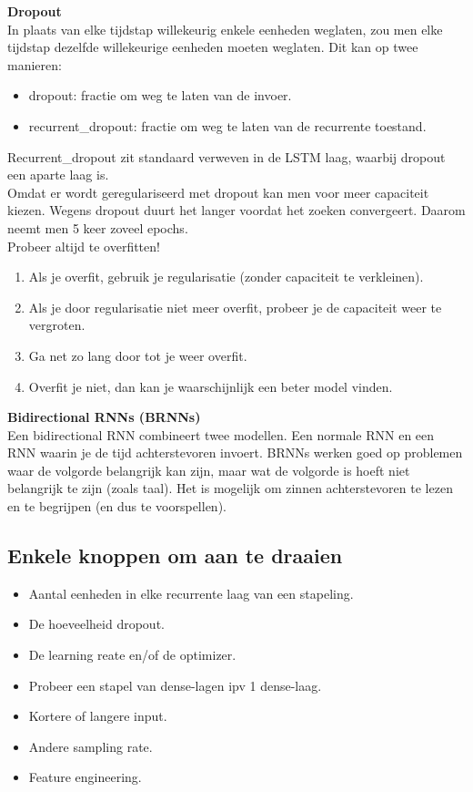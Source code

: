 {\textbf{Dropout}\\
In plaats van elke tijdstap willekeurig enkele eenheden weglaten, zou men elke tijdstap dezelfde willekeurige eenheden moeten weglaten. Dit kan op twee manieren:
\begin{itemize}
    \item {\selectfont dropout}: fractie om weg te laten van de invoer.
    \item {\selectfont recurrent\_dropout}: fractie om weg te laten van de recurrente toestand.
\end{itemize}
{\selectfont Recurrent\_dropout} zit standaard verweven in de LSTM laag, waarbij {\selectfont dropout} een aparte laag is.\\

\noindent Omdat er wordt geregulariseerd met dropout kan men voor meer capaciteit kiezen. Wegens dropout duurt het langer voordat het zoeken convergeert. Daarom neemt men 5 keer zoveel epochs.\\

\noindent Probeer altijd te overfitten!
\begin{enumerate}
    \item Als je overfit, gebruik je regularisatie (zonder capaciteit te verkleinen).
    \item Als je door regularisatie niet meer overfit, probeer je de capaciteit weer te vergroten.
    \item Ga net zo lang door tot je weer overfit.
    \item Overfit je niet, dan kan je waarschijnlijk een beter model vinden.
\end{enumerate}

\textbf{Bidirectional RNNs (BRNNs)}\\
Een bidirectional RNN combineert twee modellen. Een normale RNN en een RNN waarin je de tijd achterstevoren invoert. BRNNs werken goed op problemen waar de volgorde belangrijk kan zijn, maar wat de volgorde is hoeft niet belangrijk te zijn (zoals taal). Het is mogelijk om zinnen achterstevoren te lezen en te begrijpen (en dus te voorspellen).\\

\subsection{Enkele knoppen om aan te draaien}
\begin{itemize}
    \item Aantal eenheden in elke recurrente laag van een stapeling.
    \item De hoeveelheid dropout.
    \item De learning reate en/of de optimizer.
    \item Probeer een stapel van dense-lagen ipv 1 dense-laag.
    \item Kortere of langere input.
    \item Andere sampling rate.
    \item Feature engineering.
\end{itemize}



}
